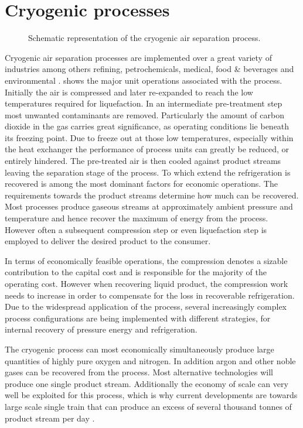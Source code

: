     \section{Cryogenic processes}
    \label{sec:cryo_air_sep}
    \begin{figure}
        \center
        
        \caption[Air Separation Unit]{Schematic representation of the cryogenic air separation process.}
        \label{fig:ASU}
    \end{figure}
    Cryogenic air separation processes are implemented over a great variety of industries among others refining,
    petrochemicals, medical, food \& beverages and environmental \cite{Sirdeshpande.2005}. 
    shows the major unit operations associated with the process. Initially the air is compressed and later re-expanded
    to reach the low temperatures required for liquefaction. In an intermediate pre-treatment step most unwanted
    contaminants are removed. Particularly the amount of carbon dioxide in the gas carries great significance, as
    operating conditions lie beneath its freezing point. Due to freeze out at those low temperatures, especially
    within the heat exchanger the performance of process units can greatly be reduced, or entirely hindered.
    The pre-treated air is then cooled against product streams leaving the separation stage of the process. To which extend
    the refrigeration is  recovered is among the most dominant factors for economic operations. The requirements
    towards the product streams determine how much can be recovered. Most processes produce gaseous streams at
    approximately ambient pressure and temperature \cite{Smith.2001} and hence recover the maximum of energy from the
    process. However often a subsequent compression step or even liquefaction step is employed to deliver the
    desired product to the consumer.

    In terms of economically feasible operations, the compression denotes a sizable contribution to the capital cost
    and is responsible for the majority of the operating cost. However when recovering liquid product, the
    compression work needs to increase in order to compensate for the loss in recoverable refrigeration. Due to the widespread
    application of the  process, several increasingly complex process configurations are being implemented
    with different strategies, for internal recovery of pressure energy and refrigeration.

    The cryogenic process can most economically simultaneously produce large quantities of highly pure oxygen and nitrogen.
    In addition argon and other noble gases can be recovered from the process. Most alternative technologies will
    produce one single product stream. Additionally the economy of scale can very well be exploited for this
    process, which is why current developments are towards large scale single train that can produce
    an excess of several thousand tonnes of product stream per day \cite{Castle.2002}.

